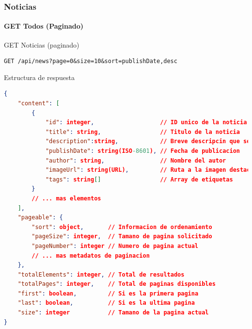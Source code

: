 \documentclass[11pt,a4paper]{article}
\begin{document}
\subsubsection{Noticias}
\paragraph{GET Todos (Paginado)}

\begin{center}
	\begin{minipage}{\textwidth}
		\begin{codebox}{GET Noticias (paginado)}
			\begin{lstlisting}[language=HTTP]
GET /api/news?page=0&size=10&sort=publishDate,desc
\end{lstlisting}
		\end{codebox}
	\end{minipage}
\end{center}

\begin{center}
	\begin{minipage}{\textwidth}
		\begin{codebox}{Estructura de respuesta}
			\begin{lstlisting}[language=json]
{
    "content": [
        {
            "id": integer,                   // ID unico de la noticia
            "title": string,                 // Titulo de la noticia
			"description":string,			 // Breve descripcin que se muestra 
            "publishDate": string(ISO-8601), // Fecha de publicacion
            "author": string,                // Nombre del autor
            "imageUrl": string(URL),         // Ruta a la imagen destacada
            "tags": string[]                 // Array de etiquetas
        }
        // ... mas elementos
    ],
    "pageable": {
        "sort": object,       // Informacion de ordenamiento
        "pageSize": integer,  // Tamano de pagina solicitado
        "pageNumber": integer // Numero de pagina actual
        // ... mas metadatos de paginacion
    },
    "totalElements": integer, // Total de resultados
    "totalPages": integer,    // Total de paginas disponibles
    "first": boolean,         // Si es la primera pagina
    "last": boolean,          // Si es la ultima pagina
    "size": integer           // Tamano de la pagina actual
}
\end{lstlisting}
		\end{codebox}
	\end{minipage}
\end{center}
\end{document}

